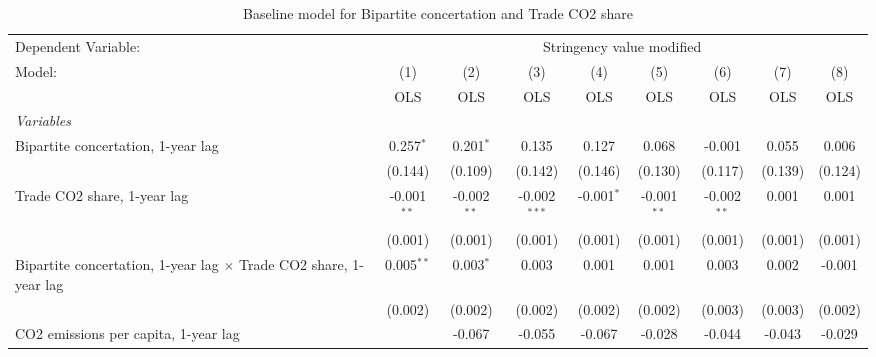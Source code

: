 
\begin{table}[htbp]
   \caption{Baseline model for Bipartite concertation and Trade CO2 share}
   \centering
   \begin{tabular}{lcccccccc}
      \toprule
      Dependent Variable: & \multicolumn{8}{c}{Stringency value modified}\\
      Model:                                                                   & (1)           & (2)           & (3)            & (4)          & (5)           & (6)           & (7)           & (8)\\  
                                                                               &  OLS          & OLS           & OLS            & OLS          & OLS           & OLS           & OLS           & OLS\\  
      \midrule
      \emph{Variables}\\
      Bipartite concertation, 1-year lag                                       & 0.257$^{*}$   & 0.201$^{*}$   & 0.135          & 0.127        & 0.068         & -0.001        & 0.055         & 0.006\\   
                                                                               & (0.144)       & (0.109)       & (0.142)        & (0.146)      & (0.130)       & (0.117)       & (0.139)       & (0.124)\\   
      Trade CO2 share, 1-year lag                                              & -0.001$^{**}$ & -0.002$^{**}$ & -0.002$^{***}$ & -0.001$^{*}$ & -0.001$^{**}$ & -0.002$^{**}$ & 0.001         & 0.001\\   
                                                                               & (0.001)       & (0.001)       & (0.001)        & (0.001)      & (0.001)       & (0.001)       & (0.001)       & (0.001)\\   
      Bipartite concertation, 1-year lag $\times$ Trade CO2 share, 1-year lag  & 0.005$^{**}$  & 0.003$^{*}$   & 0.003          & 0.001        & 0.001         & 0.003         & 0.002         & -0.001\\   
                                                                               & (0.002)       & (0.002)       & (0.002)        & (0.002)      & (0.002)       & (0.003)       & (0.003)       & (0.002)\\   
      CO2 emissions per capita, 1-year lag                                     &               & -0.067        & -0.055         & -0.067       & -0.028        & -0.044        & -0.043        & -0.029\\   

\end{tabular}
\end{table}
